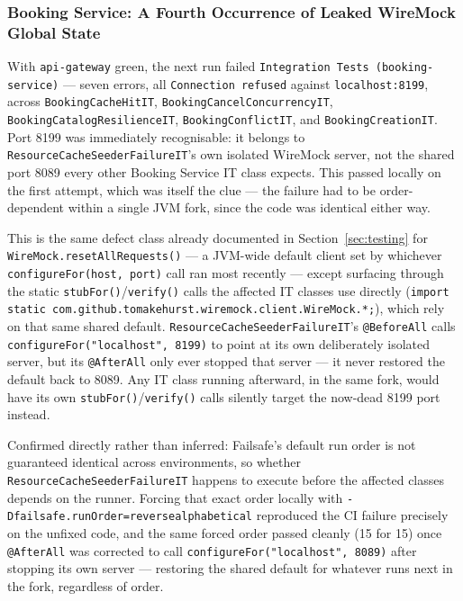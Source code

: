 \subsubsection{Booking Service: A Fourth Occurrence of Leaked WireMock Global State}

With \texttt{api-gateway} green, the next run failed \texttt{Integration Tests (booking-service)} --- seven errors, all \texttt{Connection refused} against \texttt{localhost:8199}, across \texttt{BookingCacheHitIT}, \texttt{BookingCancelConcurrencyIT}, \texttt{BookingCatalogResilienceIT}, \texttt{BookingConflictIT}, and \texttt{BookingCreationIT}. Port 8199 was immediately recognisable: it belongs to \texttt{ResourceCacheSeederFailureIT}'s own isolated WireMock server, not the shared port 8089 every other Booking Service IT class expects. This passed locally on the first attempt, which was itself the clue --- the failure had to be order-dependent within a single JVM fork, since the code was identical either way.

This is the same defect class already documented in Section~\ref{sec:testing} for \texttt{WireMock.resetAllRequests()} --- a JVM-wide default client set by whichever \texttt{configureFor(host, port)} call ran most recently --- except surfacing through the static \texttt{stubFor()}/\texttt{verify()} calls the affected IT classes use directly (\texttt{import static com.github.tomakehurst.wiremock.client.WireMock.*;}), which rely on that same shared default. \texttt{ResourceCacheSeederFailureIT}'s \texttt{@BeforeAll} calls \texttt{configureFor("localhost", 8199)} to point at its own deliberately isolated server, but its \texttt{@AfterAll} only ever stopped that server --- it never restored the default back to 8089. Any IT class running afterward, in the same fork, would have its own \texttt{stubFor()}/\texttt{verify()} calls silently target the now-dead 8199 port instead.

Confirmed directly rather than inferred: Failsafe's default run order is not guaranteed identical across environments, so whether \texttt{ResourceCacheSeederFailureIT} happens to execute before the affected classes depends on the runner. Forcing that exact order locally with \texttt{-Dfailsafe.runOrder=reversealphabetical} reproduced the CI failure precisely on the unfixed code, and the same forced order passed cleanly (15 for 15) once \texttt{@AfterAll} was corrected to call \texttt{configureFor("localhost", 8089)} after stopping its own server --- restoring the shared default for whatever runs next in the fork, regardless of order.

